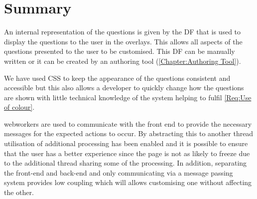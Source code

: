 \section{Summary}

An internal representation of the questions is given by the \gls{DF} that is used to display the questions to the user in the overlays. This allows all aspects of the questions presented to the user to be customised. This \gls{DF} can be manually written or it can be created by an authoring tool (\autoref{Chapter:Authoring Tool}).

We have used \gls{CSS} to keep the appearance of the questions consistent and accessible but this also allows a developer to quickly change how the questions are shown with little technical knowledge of the system helping to fulfil \cref{Req:Use of colour}.

\Glspl{webworker} are used to communicate with the front end to provide the necessary messages for the expected actions to occur. By abstracting this to another thread utilisation of additional processing has been enabled and it is possible to ensure that the user has a better experience since the page is not as likely to freeze due to the additional thread sharing some of the processing. In addition, separating the front-end and back-end and only communicating via a message passing system provides low coupling which will allows customising one without affecting the other.
